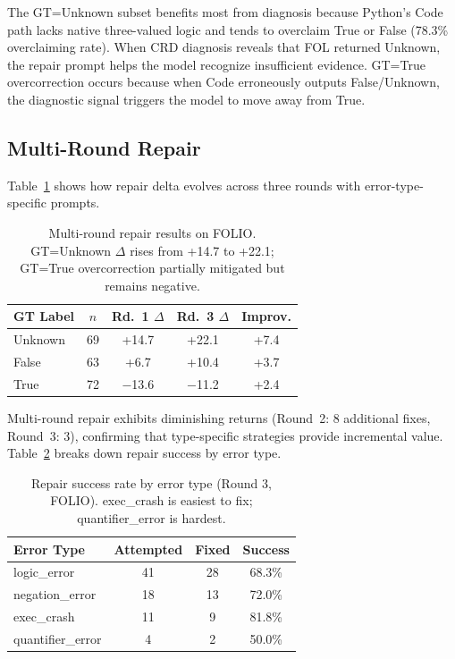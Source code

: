 \documentclass[11pt,a4paper]{article}
\newcommand{\pp}{\text{pp}}
\begin{document}
The GT=Unknown subset benefits most from diagnosis because Python's Code path lacks native three-valued logic and tends to overclaim True or False (78.3\% overclaiming rate). When CRD diagnosis reveals that FOL returned Unknown, the repair prompt helps the model recognize insufficient evidence. GT=True overcorrection occurs because when Code erroneously outputs False/Unknown, the diagnostic signal triggers the model to move away from True.

\subsection{Multi-Round Repair}
\label{sec:multiround}

Table~\ref{tab:multiround} shows how repair delta evolves across three rounds with error-type-specific prompts.

\begin{table}[t]
\centering
\small
\begin{tabular}{lcccc}
\toprule
\textbf{GT Label} & $n$ & \textbf{Rd.~1 $\Delta$} & \textbf{Rd.~3 $\Delta$} & \textbf{Improv.} \\
\midrule
Unknown & 69 & +14.7\pp{} & +22.1\pp{} & +7.4\pp{} \\
False & 63 & +6.7\pp{} & +10.4\pp{} & +3.7\pp{} \\
True & 72 & $-$13.6\pp{} & $-$11.2\pp{} & +2.4\pp{} \\
\bottomrule
\end{tabular}
\caption{Multi-round repair results on FOLIO. GT=Unknown $\Delta$ rises from +14.7 to +22.1\pp{}; GT=True overcorrection partially mitigated but remains negative.}
\label{tab:multiround}
\end{table}

Multi-round repair exhibits diminishing returns (Round~2: 8 additional fixes, Round~3: 3), confirming that type-specific strategies provide incremental value. Table~\ref{tab:repair_by_type} breaks down repair success by error type.

\begin{table}[t]
\centering
\small
\begin{tabular}{lccc}
\toprule
\textbf{Error Type} & \textbf{Attempted} & \textbf{Fixed} & \textbf{Success} \\
\midrule
logic\_error & 41 & 28 & 68.3\% \\
negation\_error & 18 & 13 & 72.0\% \\
exec\_crash & 11 & 9 & 81.8\% \\
quantifier\_error & 4 & 2 & 50.0\% \\
\bottomrule
\end{tabular}
\caption{Repair success rate by error type (Round 3, FOLIO). exec\_crash is easiest to fix; quantifier\_error is hardest.}
\label{tab:repair_by_type}
\end{table}
\end{document}
